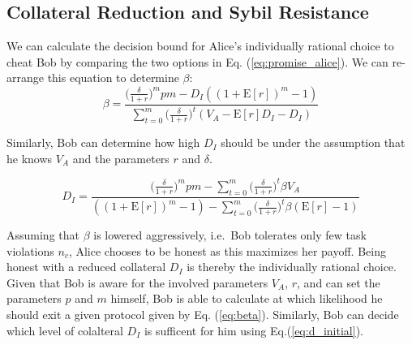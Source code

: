 \documentclass[runningheads]{llncs}
\newcommand{\sys}{Promise\xspace}
\newcommand{\dom}[1]{\todo[linecolor=green,backgroundcolor=green!25,bordercolor=green,inline,caption={}]{Comment by Dominik: #1}}
\begin{document}

\subsection{Collateral Reduction and Sybil Resistance}

We can calculate the decision bound for Alice's individually rational choice to cheat Bob by comparing the two options in Eq. (\ref{eq:promise_alice}).
We can re-arrange this equation to determine $\beta$:
\begin{equation}
    \label{eq:beta}
    \beta = \frac{\big( \frac{\delta}{1+r} \big)^{m} pm - D_{I}((1+\mathrm{E}[r])^{m}-1)}{\sum_{t=0}^{m} \big( \frac{\delta}{1+r} \big)^{t} (V_A - \mathrm{E}[r]D_{I}-D_{I})}
\end{equation}

Similarly, Bob can determine how high $D_I$ should be under the assumption that he knows $V_A$ and the parameters $r$ and $\delta$.

\begin{equation}
    \label{eq:d_initial}
    D_I = \frac{\big( \frac{\delta}{1+r} \big)^{m} pm - \sum_{t=0}^{m} \big( \frac{\delta}{1+r} \big)^{t} \beta V_A}{ ((1+\mathrm{E}[r])^{m}-1) - \sum_{t=0}^{m} \big( \frac{\delta}{1+r} \big)^{t} \beta (\mathrm{E}[r]-1)}
\end{equation}

Assuming that $\beta$ is lowered aggressively, i.e.\ Bob tolerates only few task violations $n_c$, Alice  chooses to be honest as this maximizes her payoff.
Being honest with a reduced collateral $D_I$ is thereby the individually rational choice.
Given that Bob is aware for the involved parameters $V_A$, $r$, and can set the parameters $p$ and $m$ himself, Bob is able to calculate at which likelihood he should exit a given protocol given by Eq. (\ref{eq:beta}).
Similarly, Bob can decide which level of colalteral $D_I$ is sufficent for him using Eq.(\ref{eq:d_initial}).
\end{document}
